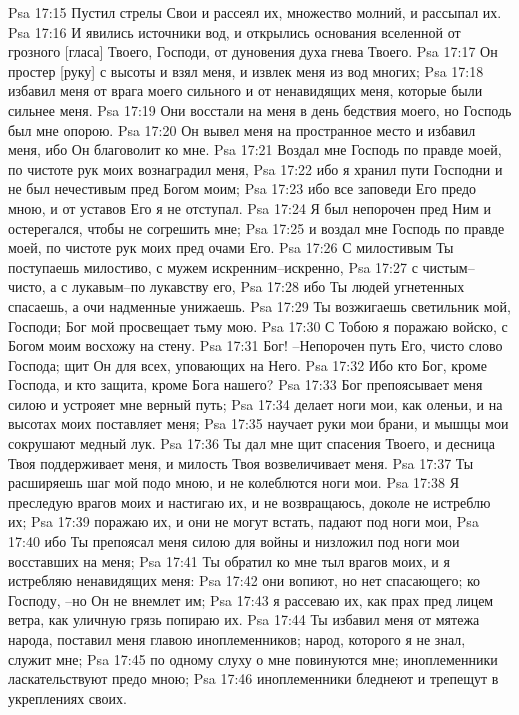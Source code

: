 Psa 17:15  Пустил стрелы Свои и рассеял их, множество молний, и рассыпал их.
Psa 17:16  И явились источники вод, и открылись основания вселенной от грозного [гласа] Твоего, Господи, от дуновения духа гнева Твоего.
Psa 17:17  Он простер [руку] с высоты и взял меня, и извлек меня из вод многих;
Psa 17:18  избавил меня от врага моего сильного и от ненавидящих меня, которые были сильнее меня.
Psa 17:19  Они восстали на меня в день бедствия моего, но Господь был мне опорою.
Psa 17:20  Он вывел меня на пространное место и избавил меня, ибо Он благоволит ко мне.
Psa 17:21  Воздал мне Господь по правде моей, по чистоте рук моих вознаградил меня,
Psa 17:22  ибо я хранил пути Господни и не был нечестивым пред Богом моим;
Psa 17:23  ибо все заповеди Его предо мною, и от уставов Его я не отступал.
Psa 17:24  Я был непорочен пред Ним и остерегался, чтобы не согрешить мне;
Psa 17:25  и воздал мне Господь по правде моей, по чистоте рук моих пред очами Его.
Psa 17:26  С милостивым Ты поступаешь милостиво, с мужем искренним--искренно,
Psa 17:27  с чистым--чисто, а с лукавым--по лукавству его,
Psa 17:28  ибо Ты людей угнетенных спасаешь, а очи надменные унижаешь.
Psa 17:29  Ты возжигаешь светильник мой, Господи; Бог мой просвещает тьму мою.
Psa 17:30  С Тобою я поражаю войско, с Богом моим восхожу на стену.
Psa 17:31  Бог! --Непорочен путь Его, чисто слово Господа; щит Он для всех, уповающих на Него.
Psa 17:32  Ибо кто Бог, кроме Господа, и кто защита, кроме Бога нашего?
Psa 17:33  Бог препоясывает меня силою и устрояет мне верный путь;
Psa 17:34  делает ноги мои, как оленьи, и на высотах моих поставляет меня;
Psa 17:35  научает руки мои брани, и мышцы мои сокрушают медный лук.
Psa 17:36  Ты дал мне щит спасения Твоего, и десница Твоя поддерживает меня, и милость Твоя возвеличивает меня.
Psa 17:37  Ты расширяешь шаг мой подо мною, и не колеблются ноги мои.
Psa 17:38  Я преследую врагов моих и настигаю их, и не возвращаюсь, доколе не истреблю их;
Psa 17:39  поражаю их, и они не могут встать, падают под ноги мои,
Psa 17:40  ибо Ты препоясал меня силою для войны и низложил под ноги мои восставших на меня;
Psa 17:41  Ты обратил ко мне тыл врагов моих, и я истребляю ненавидящих меня:
Psa 17:42  они вопиют, но нет спасающего; ко Господу, --но Он не внемлет им;
Psa 17:43  я рассеваю их, как прах пред лицем ветра, как уличную грязь попираю их.
Psa 17:44  Ты избавил меня от мятежа народа, поставил меня главою иноплеменников; народ, которого я не знал, служит мне;
Psa 17:45  по одному слуху о мне повинуются мне; иноплеменники ласкательствуют предо мною;
Psa 17:46  иноплеменники бледнеют и трепещут в укреплениях своих.
